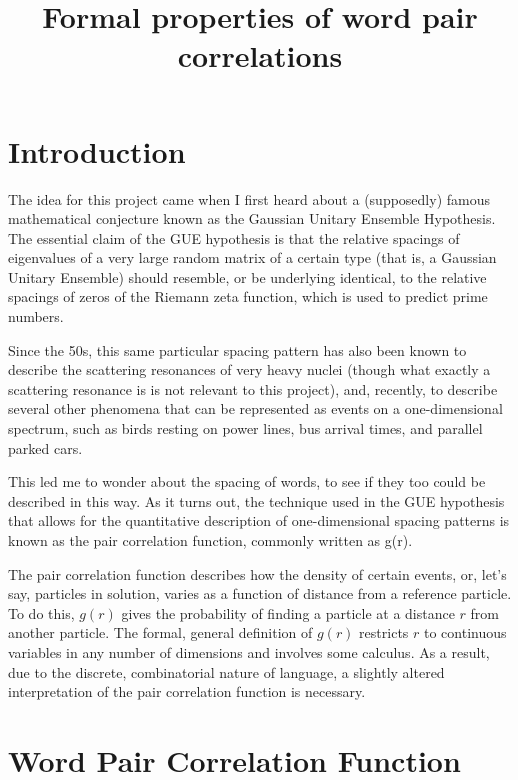 \documentclass[11pt,letterpaper]{article}
\title{
Formal properties of word pair correlations
}
\author{
}
\theoremstyle{definition}
\begin{document}
\maketitle

\section{Introduction}

The idea for this project came when I first heard about a (supposedly) famous mathematical conjecture known as the Gaussian Unitary Ensemble Hypothesis. The essential claim of the GUE hypothesis is that the relative spacings of eigenvalues of a very large random matrix of a certain type (that is, a Gaussian Unitary Ensemble) should resemble, or be underlying identical, to the relative spacings of zeros of the Riemann zeta function, which is used to predict prime numbers. 

Since the 50s, this same particular spacing pattern has also been known to describe the scattering resonances of very heavy nuclei (though what exactly a scattering resonance is is not relevant to this project), and, recently, to describe several other phenomena that can be represented as events on a one-dimensional spectrum, such as birds resting on power lines, bus arrival times, and parallel parked cars. 

This led me to wonder about the spacing of words, to see if they too could be described in this way. As it turns out, the technique used in the GUE hypothesis that allows for the quantitative description of one-dimensional spacing patterns is known as the pair correlation function, commonly written as g(r).

The pair correlation function describes how the density of certain events, or, let's say, particles in solution, varies as a function of distance from a reference particle. To do this, $g(r)$ gives the probability of finding a particle at a distance $r$ from another particle. The formal, general definition of $g(r)$ restricts $r$ to continuous variables in any number of dimensions and involves some calculus. As a result, due to the discrete, combinatorial nature of language, a slightly altered interpretation of the pair correlation function is necessary.

\section{Word Pair Correlation Function}
\end{document}
